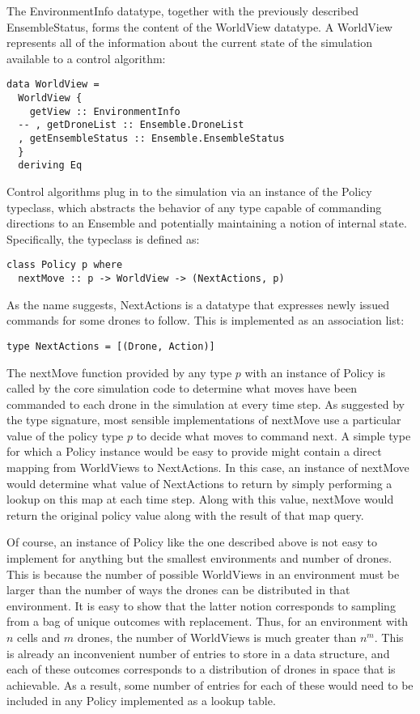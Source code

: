 The EnvironmentInfo datatype, together with the previously described EnsembleStatus, forms the content of the WorldView datatype. A WorldView represents all of the information about the current state of the simulation available to a control algorithm:

\begin{verbatim}
data WorldView = 
  WorldView {
    getView :: EnvironmentInfo
  -- , getDroneList :: Ensemble.DroneList
  , getEnsembleStatus :: Ensemble.EnsembleStatus
  }
  deriving Eq
\end{verbatim}

Control algorithms plug in to the simulation via an instance of the Policy typeclass, which abstracts the behavior of any type capable of commanding directions to an Ensemble and potentially maintaining a notion of internal state. Specifically, the typeclass is defined as:

\begin{verbatim}
class Policy p where
  nextMove :: p -> WorldView -> (NextActions, p)
\end{verbatim}

As the name suggests, NextActions is a datatype that expresses newly issued commands for some drones to follow. This is implemented as an association list:

\begin{verbatim}
type NextActions = [(Drone, Action)]
\end{verbatim}

The nextMove function provided by any type $p$ with an instance of Policy is called by the core simulation code to determine what moves have been commanded to each drone in the simulation at every time step. As suggested by the type signature, most sensible implementations of nextMove use a particular value of the policy type $p$ to decide what moves to command next. A simple type for which a Policy instance would be easy to provide might contain a direct mapping from WorldViews to NextActions. In this case, an instance of nextMove would determine what value of NextActions to return by simply performing a lookup on this map at each time step. Along with this value, nextMove would return the original policy value along with the result of that map query. 

Of course, an instance of Policy like the one described above is not easy to implement for anything but the smallest environments and number of drones. This is because the number of possible WorldViews in an environment must be larger than the number of ways the drones can be distributed in that environment. It is easy to show that the latter notion corresponds to sampling from a bag of unique outcomes with replacement. Thus, for an environment with $n$ cells and $m$ drones, the number of WorldViews is much greater than $n^m$. This is already an inconvenient number of entries to store in a data structure, and each of these outcomes corresponds to a distribution of drones in space that is achievable. As a result, some number of entries for each of these would need to be included in any Policy implemented as a lookup table.

